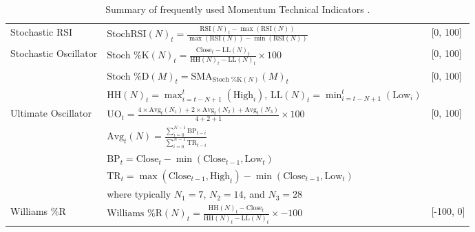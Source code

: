 \begin{table}[htb!]
\begin{tabularx}{\textwidth}{@{}lXl@{}}
\addlinespace
Stochastic RSI & $\text{StochRSI}(N)_t = \frac{\text{RSI}(N)_t - \max(\text{RSI}(N))}{\max(\text{RSI}(N)) - \min(\text{RSI}(N))}$ & [0, 100] \\
\addlinespace
Stochastic Oscillator & $\text{Stoch \%K}(N)_t = \frac{\text{Close}_t - \text{LL}(N)_t}{\text{HH}(N)_t - \text{LL}(N)_t} \times 100$ & [0, 100] \\
\addlinespace
& $\text{Stoch \%D}(M)_t = \text{SMA}_{\text{Stoch \%K}(N)}(M)_t$ & [0, 100] \\
\addlinespace
& $\text{HH}(N)_t = \max_{i=t-N+1}^{t}(\text{High}_i)$, $\text{LL}(N)_t = \min_{i=t-N+1}^{t}(\text{Low}_i)$ & \\
\addlinespace
Ultimate Oscillator & $\text{UO}_t = \frac{4 \times \text{Avg}_t(N_1) + 2 \times \text{Avg}_t(N_2) + \text{Avg}_t(N_3)}{4+2+1} \times 100$ & [0, 100] \\
\addlinespace
& $\text{Avg}_t(N) = \frac{\sum_{i=0}^{N-1}\text{BP}_{t-i}}{\sum_{i=0}^{N-1}\text{TR}_{t-i}}$ & \\
\addlinespace
& $\text{BP}_t = \text{Close}_t - \min(\text{Close}_{t-1}, \text{Low}_t)$ & \\
\addlinespace
& $\text{TR}_t = \max(\text{Close}_{t-1}, \text{High}_t) - \min(\text{Close}_{t-1}, \text{Low}_t)$ & \\
\addlinespace
& where typically $N_1 = 7$, $N_2 = 14$, and $N_3 = 28$ & \\
\addlinespace
Williams \%R & $\text{Williams \%R}(N)_t = \frac{\text{HH}(N)_t - \text{Close}_t}{\text{HH}(N)_t - \text{LL}(N)_t} \times -100$ & [-100, 0] \\
\bottomrule
\end{tabularx}
\caption{Summary of frequently used Momentum Technical Indicators \cite{jansen_machine_2020}.}
\label{Tables:MomentumIndicators}
\end{table}
